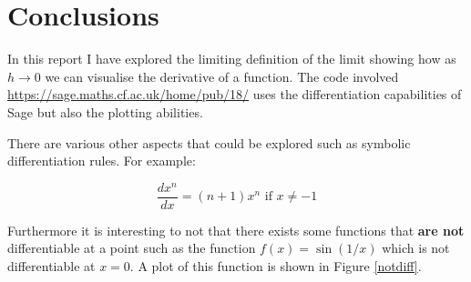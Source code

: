 \documentclass[a4paper]{article}
\begin{document}
\section{Conclusions}

In this report I have explored the limiting definition of the limit showing how as $h\to 0$ we can visualise the derivative of a function. The code involved \url{https://sage.maths.cf.ac.uk/home/pub/18/} uses the differentiation capabilities of Sage but also the plotting abilities.

There are various other aspects that could be explored such as symbolic differentiation rules. For example:

$$\frac{dx^n}{dx}=(n+1)x^{n}\text{ if }x\ne-1$$

Furthermore it is interesting to not that there exists some functions that \textbf{are not} differentiable at a point such as the function $f(x)=\sin(1/x)$ which is not differentiable at $x=0$. A plot of this function is shown in Figure \ref{notdiff}.






\end{document}
